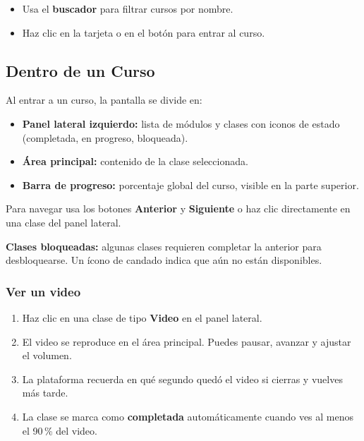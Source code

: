 \documentclass[a4paper,11pt]{article}
\begin{document}
\begin{itemize}
  \item Usa el \textbf{buscador} para filtrar cursos por nombre.
  \item Haz clic en la tarjeta o en el bot\'on para entrar al curso.
\end{itemize}

\subsection{Dentro de un Curso}

Al entrar a un curso, la pantalla se divide en:

\begin{itemize}
  \item \textbf{Panel lateral izquierdo:} lista de m\'odulos y clases con
        iconos de estado (completada, en progreso, bloqueada).
  \item \textbf{\'Area principal:} contenido de la clase seleccionada.
  \item \textbf{Barra de progreso:} porcentaje global del curso, visible
        en la parte superior.
\end{itemize}

Para navegar usa los botones \textbf{Anterior} y \textbf{Siguiente} o haz
clic directamente en una clase del panel lateral.

\begin{warnbox}
\textbf{Clases bloqueadas:} algunas clases requieren completar la anterior
para desbloquearse. Un \'icono de candado indica que a\'un no est\'an
disponibles.
\end{warnbox}

\subsubsection{Ver un video}

\begin{enumerate}
  \item Haz clic en una clase de tipo \textbf{Video} en el panel lateral.
  \item El video se reproduce en el \'area principal. Puedes pausar, avanzar
        y ajustar el volumen.
  \item La plataforma recuerda en qu\'e segundo qued\'o el video
        si cierras y vuelves m\'as tarde.
  \item La clase se marca como \textbf{completada} autom\'aticamente cuando
        ves al menos el 90\,\% del video.
\end{enumerate}
\end{document}
